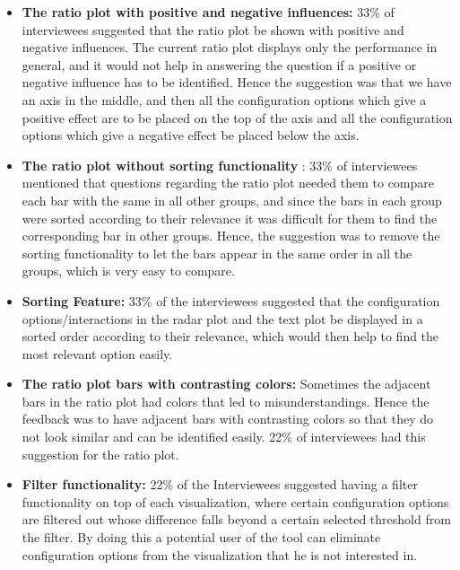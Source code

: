 \begin{itemize}

 \item \textbf{The ratio plot with positive and negative influences:} 33\% of interviewees suggested that the ratio plot be shown with positive and negative influences. The current ratio plot displays only the performance in general, and it would not help in answering the question if a positive or negative influence has to be identified. Hence the suggestion was that we have an axis in the middle, and then all the configuration options which give a positive effect are to be placed on the top of the axis and all the configuration options which give a negative effect be placed below the axis.
 
 \item\textbf{The ratio plot without sorting functionality} : 33\% of interviewees mentioned that questions regarding the ratio plot needed them to compare each bar with the same in all other groups, and since the bars in each group were sorted according to their relevance it was difficult for them to find the corresponding bar in other groups. Hence, the suggestion was to remove the sorting functionality to let the bars appear in the same order in all the groups, which is very easy to compare.
 
 \item \textbf{Sorting Feature:} 33\% of the interviewees suggested that the configuration options/interactions in the radar plot and the text plot be displayed in a sorted order according to their relevance, which would then help to find the most relevant option easily.
 
\item \textbf{The ratio plot bars with contrasting colors:} Sometimes the adjacent bars in the ratio plot had colors that led to misunderstandings. Hence the feedback was to have adjacent bars with contrasting colors so that they do not look similar and can be identified easily. 22\% of interviewees had this suggestion for the ratio plot.
 
\item \textbf{Filter functionality:} 22\% of the Interviewees suggested having a filter functionality on top of each visualization, where certain configuration options are filtered out whose difference falls beyond a certain selected threshold from the filter. By doing this a potential user of the tool can eliminate configuration options from the visualization that he is not interested in.


\end{itemize}
